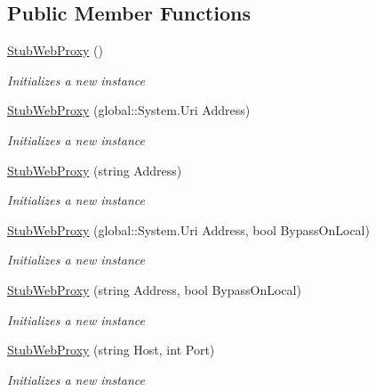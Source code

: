 \subsection*{Public Member Functions}
\begin{DoxyCompactItemize}
\item 
\hyperlink{class_system_1_1_net_1_1_fakes_1_1_stub_web_proxy_a6e29ad6e27d17154b1f046a6468f87d9}{Stub\-Web\-Proxy} ()
\begin{DoxyCompactList}\small\item\em Initializes a new instance\end{DoxyCompactList}\item 
\hyperlink{class_system_1_1_net_1_1_fakes_1_1_stub_web_proxy_a06dbabf61400a1c131c4985649076534}{Stub\-Web\-Proxy} (global\-::\-System.\-Uri Address)
\begin{DoxyCompactList}\small\item\em Initializes a new instance\end{DoxyCompactList}\item 
\hyperlink{class_system_1_1_net_1_1_fakes_1_1_stub_web_proxy_a26018f78319b230996e526384497457f}{Stub\-Web\-Proxy} (string Address)
\begin{DoxyCompactList}\small\item\em Initializes a new instance\end{DoxyCompactList}\item 
\hyperlink{class_system_1_1_net_1_1_fakes_1_1_stub_web_proxy_a989c95870c0d621a05a01d0e3d6123fb}{Stub\-Web\-Proxy} (global\-::\-System.\-Uri Address, bool Bypass\-On\-Local)
\begin{DoxyCompactList}\small\item\em Initializes a new instance\end{DoxyCompactList}\item 
\hyperlink{class_system_1_1_net_1_1_fakes_1_1_stub_web_proxy_aa5935df53bb5be78e293576b973ec52f}{Stub\-Web\-Proxy} (string Address, bool Bypass\-On\-Local)
\begin{DoxyCompactList}\small\item\em Initializes a new instance\end{DoxyCompactList}\item 
\hyperlink{class_system_1_1_net_1_1_fakes_1_1_stub_web_proxy_a8de2cb5b046c0c3e70a3e7e144df5556}{Stub\-Web\-Proxy} (string Host, int Port)
\begin{DoxyCompactList}\small\item\em Initializes a new instance\end{DoxyCompactList}\item 

\end{DoxyCompactItemize}
